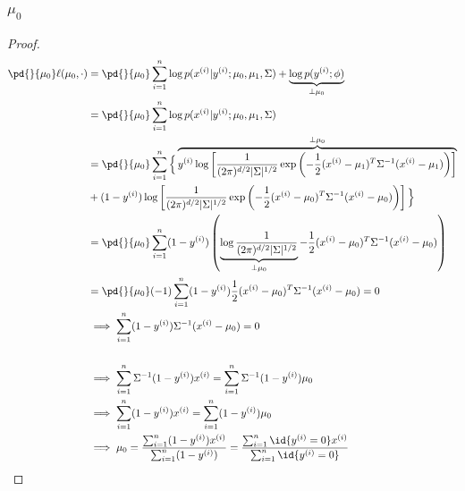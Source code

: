 \documentclass[11pt]{article}
\newcommand{\upi}[0]{^{(i)}}
\begin{document}
	\subsubsection{$\mu_0$}
	\begin{proof}
		\begin{align}
			\pd{}{\mu_0} \ell(\mu_0, \cdot) &= \pd{}{\mu_0} \sum_{i=1}^n
		\log p(x\upi|y\upi; \mu_0, \mu_1, \Sigma)
		+ \underbrace{\log p(y\upi; \phi)}_{\perp \mu_0} \\
		&= \pd{}{\mu_0} \sum_{i=1}^n \log p(x\upi|y\upi; \mu_0, \mu_1, \Sigma) \\
		&= \pd{}{\mu_0} \sum_{i=1}^n \Big\{
		\overbrace{
		y\upi \log \left [ \frac{1}{(2\pi)^{d/2}|\Sigma|^{1/2}} \exp \left (-\frac{1}{2} (x\upi - \mu_1)^T \Sigma^{-1} (x\upi - \mu_1) \right) \right ]}^{\perp \mu_0} \\
		&+ (1 - y\upi) \log \left [ \frac{1}{(2\pi)^{d/2}|\Sigma|^{1/2}} \exp \left (-\frac{1}{2} (x\upi - \mu_0)^T \Sigma^{-1} (x\upi - \mu_0) \right) \right ] \Big\} \\
		&= \pd{}{\mu_0} \sum_{i=1}^n (1 - y\upi) \left (
		\underbrace{\log \frac{1}{(2\pi)^{d/2}|\Sigma|^{1/2}}}_{\perp \mu_0}
		-\frac{1}{2} (x\upi - \mu_0)^T \Sigma^{-1} (x\upi - \mu_0) \right) \\
		&= \pd{}{\mu_0} (-1) \sum_{i=1}^n (1 - y\upi) \frac{1}{2} (x\upi - \mu_0)^T \Sigma^{-1} (x\upi - \mu_0) = 0 \\
		&\implies \sum_{i=1}^n (1 - y\upi) \Sigma^{-1} (x\upi - \mu_0) = 0 \\ \\
		&\implies \sum_{i=1}^n \Sigma^{-1} (1 - y\upi) x\upi = \sum_{i=1}^n \Sigma^{-1} (1 - y\upi) \mu_0 \\
		& \implies \sum_{i=1}^n (1 - y\upi) x\upi = \sum_{i=1}^n (1 - y\upi) \mu_0 \\
		& \implies \mu_0 = \frac{\sum_{i=1}^n (1 - y\upi) x\upi}{\sum_{i=1}^n (1 - y\upi)} = \frac{\sum_{i=1}^n \id{y\upi = 0} x\upi}{\sum_{i=1}^n \id{y\upi = 0}}
	\end{align}
	\end{proof}
	
\end{document}
